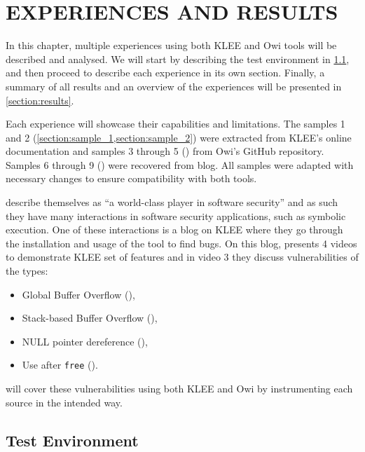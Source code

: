 \chapter{EXPERIENCES AND RESULTS}\label{chap:experiences}

In this chapter, multiple experiences using both KLEE and Owi tools will be described and analysed. We will start by describing the test environment in \cref{section:test_environment}, and then proceed to describe each experience in its own section. Finally, a summary of all results and an overview of the experiences will be presented in \cref{section:results}.

Each experience will showcase their capabilities and limitations. The samples 1 and 2 (\cref{section:sample_1,section:sample_2}) were extracted from KLEE's online documentation and samples 3 through 5 () from Owi's GitHub repository. Samples 6 through 9 () were recovered from \citeauthor{ADALogicsKLEE} blog. All samples were adapted with necessary changes to ensure compatibility with both tools.

\citeauthor{ADALogicsAboutUs} describe themselves as ``a world-class player in software security'' and as such they have many interactions in software security applications, such as symbolic execution. One of these interactions is a blog on KLEE where they go through the installation and usage of the tool to find bugs. On this blog, \citeauthor{ADALogicsKLEE}\footnotemark[1]%
 presents 4 videos to demonstrate KLEE set of features and in video 3 they discuss vulnerabilities of the types:

\begin{itemize}
    \item Global Buffer Overflow (),
    \item Stack-based Buffer Overflow (),
    \item NULL pointer dereference (),
    \item Use after \lstinline$free$ ().
\end{itemize}

 will cover these vulnerabilities using both KLEE and Owi by instrumenting each source in the intended way.

\section{Test Environment}\label{section:test_environment}

